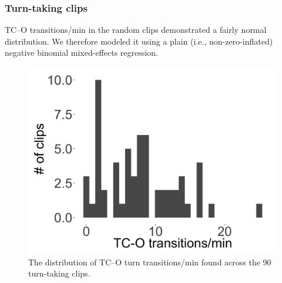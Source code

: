 \documentclass[floatsintext,man]{apa6}
\theoremstyle{definition}
\theoremstyle{definition}
\theoremstyle{definition}
\theoremstyle{remark}
\begin{document}
\FloatBarrier

\subsubsection{Turn-taking clips}\label{models-tc_o-turntaking}

TC--O transitions/min in the random clips demonstrated a fairly normal
distribution. We therefore modeled it using a plain (i.e.,
non-zero-inflated) negative binomial mixed-effects regression.

\FloatBarrier

\begin{figure}[H]

{\centering \includegraphics[width=0.4\linewidth]{www/c_o_tpm_turntaking_distribution} 

}

\caption{The distribution of TC--O turn transitions/min found across the 90 turn-taking clips.}\label{fig:fig16}
\end{figure}

\FloatBarrier
\end{document}
